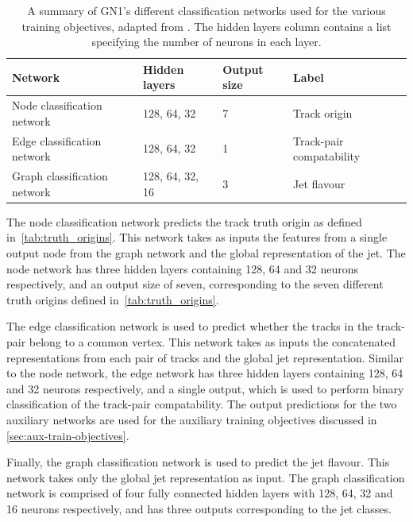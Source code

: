 \begin{table}[!htbp]
  \footnotesize\centering
  \setlength{\tabcolsep}{0.5em} %
  \begin{tabular}{llll}
      \toprule\hline 
      \textbf{Network} & \textbf{Hidden layers} & \textbf{Output size} & \textbf{Label} \\
      \hline
      Node classification network    & 128, 64, 32 & 7 & Track origin \\
      Edge classification network    & 128, 64, 32 & 1 & Track-pair compatability \\
      Graph classification network   & 128, 64, 32, 16 & 3 & Jet flavour \\
      \hline\bottomrule
  \end{tabular}
  \caption{
    A summary of GN1's different classification networks used for the various training objectives, adapted from .
    The hidden layers column contains a list specifying the number of neurons in each layer.
  }
  \label{tab:architecture}
\end{table}

The node classification network predicts the track truth origin as defined in~\cref{tab:truth_origins}.
This network takes as inputs the features from a single output node from the graph network and the global representation of the jet.
The node network has three hidden layers containing 128, 64 and 32 neurons respectively, and an output size of seven, corresponding to the seven different truth origins defined in~\cref{tab:truth_origins}.

The edge classification network is used to predict whether the tracks in the track-pair belong to a common vertex.
This network takes as inputs the concatenated representations from each pair of tracks and the global jet representation.
Similar to the node network, the edge network has three hidden layers containing 128, 64 and 32 neurons respectively, and a single output, which is used to perform binary classification of the track-pair compatability.
The output predictions for the two auxiliary networks are used for the auxiliary training objectives discussed in \cref{sec:aux-train-objectives}.

Finally, the graph classification network is used to predict the jet flavour.
This network takes only the global jet representation as input.
The graph classification network is comprised of four fully connected hidden layers with 128, 64, 32 and 16 neurons respectively, and has three outputs corresponding to the \bcl jet classes. 



